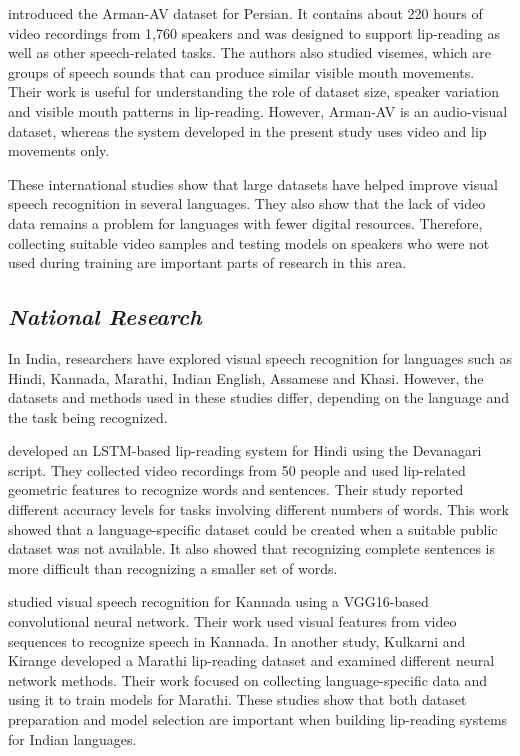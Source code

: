 \documentclass[journal]{IEEEtran}
\begin{document}
\cite{peymanfard2024armanav} introduced the Arman-AV dataset for Persian. It contains about 220 hours of video recordings from 1,760 speakers and was designed to support lip-reading as well as other speech-related tasks. The authors also studied visemes, which are groups of speech sounds that can produce similar visible mouth movements. Their work is useful for understanding the role of dataset size, speaker variation and visible mouth patterns in lip-reading. However, Arman-AV is an audio-visual dataset, whereas the system developed in the present study uses video and lip movements only.

These international studies show that large datasets have helped improve visual speech recognition in several languages. They also show that the lack of video data remains a problem for languages with fewer digital resources. Therefore, collecting suitable video samples and testing models on speakers who were not used during training are important parts of research in this area.

\subsection{\textit{National Research}}

In India, researchers have explored visual speech recognition for languages such as Hindi, Kannada, Marathi, Indian English, Assamese and Khasi. However, the datasets and methods used in these studies differ, depending on the language and the task being recognized.

\cite{patil2019hindi} developed an LSTM-based lip-reading system for Hindi using the Devanagari script. They collected video recordings from 50 people and used lip-related geometric features to recognize words and sentences. Their study reported different accuracy levels for tasks involving different numbers of words. This work showed that a language-specific dataset could be created when a suitable public dataset was not available. It also showed that recognizing complete sentences is more difficult than recognizing a smaller set of words.

\cite{rudregowda2023kannada} studied visual speech recognition for Kannada using a VGG16-based convolutional neural network. Their work used visual features from video sequences to recognize speech in Kannada. In another study, Kulkarni and Kirange \cite{kulkarni2024marathi} developed a Marathi lip-reading dataset and examined different neural network methods. Their work focused on collecting language-specific data and using it to train models for Marathi. These studies show that both dataset preparation and model selection are important when building lip-reading systems for Indian languages.
\end{document}
